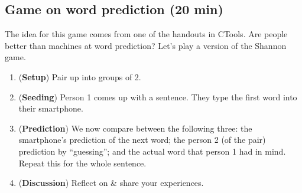\documentclass[12pt]{article}
\theoremstyle{definition}
\theoremstyle{plain}
\begin{document}
\subsection{Game on word prediction (20 min)}
The idea for this game comes from one of the handouts in CTools.
Are people better than machines at word prediction? Let's play a version of the Shannon game.
\begin{enumerate}[{Stage} 1]
    \item (\textbf{Setup}) Pair up into groups of 2.
    \item (\textbf{Seeding}) Person 1 comes up with a sentence. They type the
        first word into their smartphone.
    \item (\textbf{Prediction}) We now compare between the following three: the smartphone's prediction of the next word; the person 2 (of the pair) prediction by ``guessing''; and the actual word that person 1 had in mind. Repeat this for the whole sentence.
    \item (\textbf{Discussion}) Reflect on \& share your experiences.
\end{enumerate}



\end{document}
